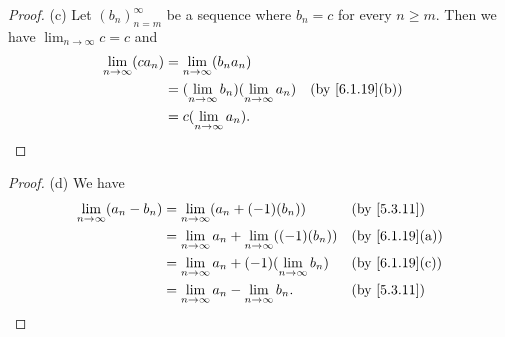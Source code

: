 \begin{proof}{(c)}
  Let \((b_n)_{n = m}^\infty\) be a sequence where \(b_n = c \) for every \(n \geq m\).
  Then we have \(\lim_{n \to \infty} c = c\) and
  \begin{align*}
    \lim_{n \to \infty} (c a_n) & = \lim_{n \to \infty} (b_n a_n)                                                        \\
                                & = (\lim_{n \to \infty} b_n)(\lim_{n \to \infty} a_n) &  & \text{(by \cref{6.1.19}(b))} \\
                                & = c(\lim_{n \to \infty} a_n).
  \end{align*}
\end{proof}

\begin{proof}{(d)}
  We have
  \begin{align*}
    \lim_{n \to \infty} (a_n - b_n) & = \lim_{n \to \infty} (a_n + (-1)(b_n))                     &  & \by{5.3.11}                  \\
                                    & = \lim_{n \to \infty} a_n + \lim_{n \to \infty} ((-1)(b_n)) &  & \text{(by \cref{6.1.19}(a))} \\
                                    & = \lim_{n \to \infty} a_n + (-1)(\lim_{n \to \infty} b_n)   &  & \text{(by \cref{6.1.19}(c))} \\
                                    & = \lim_{n \to \infty} a_n - \lim_{n \to \infty} b_n.        &  & \by{5.3.11}
  \end{align*}
\end{proof}

